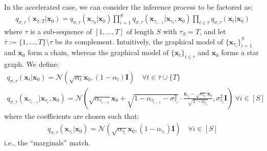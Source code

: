 In the accelerated case, we can consider the inference process to be factored as:
\begin{align}
    q_{\sigma, \tau}(\bm{x}_{1:T} | \bm{x}_0) = q_{\sigma, \tau}(\bm{x}_{\tau_{S}} | \bm{x}_0) \prod_{i=1}^{S} q_{\sigma, \tau}(\bm{x}_{\tau_{i-1}} | \bm{x}_{\tau_{i}}, \bm{x}_0) \prod_{t \in \bar{\tau}} q_{\sigma, \tau}(\bm{x}_{t} | \bm{x}_0) \label{eq:diff-new-tau}
\end{align}
where $\tau$ is a sub-sequence of $[1, \ldots, T]$ of length $S$ with $\tau_S = T$, and let $\bar{\tau} := \{1, \ldots, T\} \setminus \tau$ be its complement. Intuitively, the graphical model of $\{\bm{x}_{\tau_i}\}_{i=1}^{S}$ and $\bm{x}_0$ form a chain, whereas the graphical model of $\{\bm{x}_{t}\}_{t \in \bar{\tau}}$ and $\bm{x}_0$ forms a star graph. We define:
\begin{gather}
    q_{\sigma, \tau}(\bm{x}_{t} | \bm{x}_0) = \mathcal{N}(\sqrt{\alpha_t} \bm{x}_0, (1 - \alpha_t) \bm{I}) \quad \forall t \in \bar{\tau} \cup \{T\} \\
    q_{\sigma, \tau}(\bm{x}_{\tau_{i-1}} | \bm{x}_{\tau_{i}}, \bm{x}_0) = \mathcal{N}\left(\sqrt{\alpha_{\tau_{i-1}}} \bm{x}_{0} + \sqrt{1 - \alpha_{\tau_{i-1}} - \sigma^2_{\tau_i}} \cdot {\frac{\bm{x}_{\tau_i}  - \sqrt{\alpha_{\tau_i}} \bm{x}_0}{\sqrt{1 - \alpha_{\tau_i}}}}, \sigma_{{\tau_i}}^2 \bm{I} \right) \ \forall i \in [S] \nonumber
\end{gather}
where the coefficients are chosen such that:
\begin{align}
    q_{\sigma, \tau}(\bm{x}_{\tau_i} | \bm{x}_0) = \mathcal{N}(\sqrt{\alpha_{\tau_i}} \bm{x}_0, (1 - \alpha_{\tau_i}) \bm{I}) \quad \forall i \in [S]
\end{align}
i.e., the ``marginals'' match.

